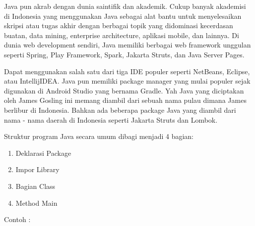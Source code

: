 Java pun akrab dengan dunia saintifik dan akademik. Cukup banyak akademisi di Indonesia yang menggunakan Java sebagai alat bantu untuk menyelesaikan skripsi atau tugas akhir dengan berbagai topik yang didominasi kecerdasan buatan, data mining, enterprise architecture, aplikasi mobile, dan lainnya. Di dunia web development sendiri, Java memiliki berbagai web framework unggulan seperti Spring, Play Framework, Spark, Jakarta Struts, dan Java Server Pages.

Dapat menggunakan salah satu dari tiga IDE populer seperti NetBeans, Eclipse, atau IntellijIDEA. Java pun memiliki package manager yang mulai populer sejak digunakan di Android Studio yang bernama Gradle. Yah Java yang diciptakan oleh James Gosling ini memang diambil dari sebuah nama pulau dimana James berlibur di Indonesia. Bahkan ada beberapa package Java yang diambil dari nama - nama daerah di Indonesia seperti Jakarta Struts dan Lombok.

Struktur program Java secara umum dibagi menjadi 4 bagian:
\begin{enumerate}
    \item Deklarasi Package
    \item Impor Library
    \item Bagian Class
    \item Method Main
\end{enumerate}

Contoh :


